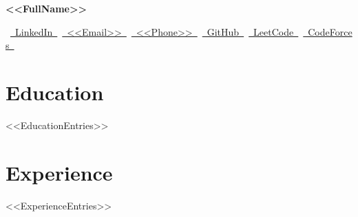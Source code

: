 \documentclass[10pt, letterpaper]{article}
\newenvironment{highlights}{
    \begin{itemize}[
        topsep=0.07 cm,
        parsep=0.07 cm,
        partopsep=0pt,
        itemsep=0pt,
        leftmargin=0.4 cm + 10pt
    ]
}{
    \end{itemize}
} %
\newenvironment{onecolentry}{
    \begin{adjustwidth}{
        0.2 cm + 0.00001 cm
    }{
        0.2 cm + 0.00001 cm
    }
}{
    \end{adjustwidth}
} %
\newenvironment{twocolentry}[2][]{
    \onecolentry
    \def\secondColumn{#2}
    \setcolumnwidth{\fill, 4.5 cm}
    \begin{paracol}{2}
}{
    \switchcolumn \raggedleft \secondColumn
    \end{paracol}
    \endonecolentry
} %
\newenvironment{header}{
    \setlength{\topsep}{0pt}\par\kern\topsep\centering\linespread{1.5}
}{
    \par\kern\topsep
} %
\let\hrefWithoutArrow\href
\renewcommand{\href}[2]{\hrefWithoutArrow{#1}{\ifthenelse{\equal{#2}{}}{ }{#2 }\raisebox{.15ex}{\footnotesize \faExternalLink*}}}
\begin{document}
    \newcommand{\AND}{\unskip
        \cleaders\copy\ANDbox\hskip\wd\ANDbox
        \ignorespaces
    }
    \newsavebox\ANDbox
    \sbox\ANDbox{}

   
    \begin{header}
        \textbf{\fontsize{24 pt}{24 pt}\selectfont <<FullName>>}

        \vspace{0.1 cm}

        \normalsize
\mbox{
\hrefWithoutArrow{<<LinkedIn>>}{
\color{black}\small\faLinkedinIn\hspace{0.15cm}LinkedIn
}
\kern 0.6cm
\hrefWithoutArrow{mailto:<<Email>>}{
\color{black}\small\faEnvelope[regular]\hspace{0.15cm}<<Email>>
}
\kern 0.6cm
\hrefWithoutArrow{tel:<<Phone>>}{
\color{black}\small\faPhone*\hspace{0.15cm}<<Phone>>
}
\kern 0.6cm
\hrefWithoutArrow{<<GitHub>>}{
\color{black}\small\faGithub\hspace{0.15cm}GitHub
}
\kern 0.6cm
\hrefWithoutArrow{<<LeetCode>>}{
\color{black}\small\faCode\hspace{0.15cm}LeetCode
}
\kern 0.6cm
\hrefWithoutArrow{<<CodeForces>>}{
\color{black}\small\faCode\hspace{0.15cm}CodeForces
}
}
    \end{header}

    \section{Education}
<<EducationEntries>>

    \section{Experience}
<<ExperienceEntries>>
\end{document}
